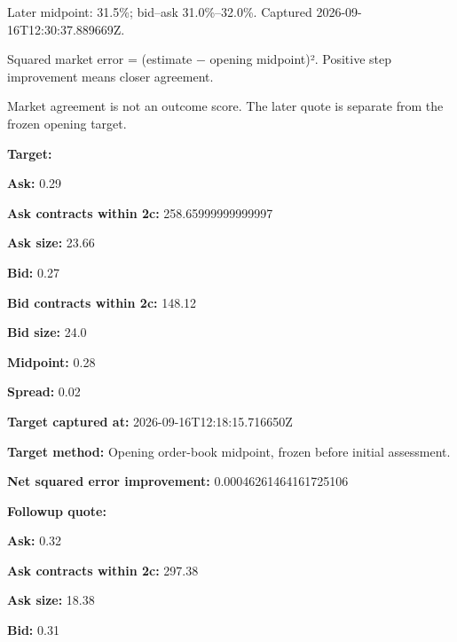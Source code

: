 \documentclass[11pt]{article}
\begin{document}
Later midpoint: 31.5\%; bid–ask 31.0\%–32.0\%. Captured 2026-09-16T12:30:37.889669Z.


Squared market error = (estimate − opening midpoint)². Positive step improvement means closer agreement.


Market agreement is not an outcome score. The later quote is separate from the frozen opening target.


\par\noindent\textbf{Target:} \par \par\noindent\textbf{Ask:} 0.29

\par\noindent\textbf{Ask contracts within 2c:} 258.65999999999997

\par\noindent\textbf{Ask size:} 23.66

\par\noindent\textbf{Bid:} 0.27

\par\noindent\textbf{Bid contracts within 2c:} 148.12

\par\noindent\textbf{Bid size:} 24.0

\par\noindent\textbf{Midpoint:} 0.28

\par\noindent\textbf{Spread:} 0.02

\par\noindent\textbf{Target captured at:} 2026-09-16T12:18:15.716650Z

\par\noindent\textbf{Target method:} Opening order-book midpoint, frozen before initial assessment.

\par\noindent\textbf{Net squared error improvement:} 0.00046261464161725106

\par\noindent\textbf{Followup quote:} \par \par\noindent\textbf{Ask:} 0.32

\par\noindent\textbf{Ask contracts within 2c:} 297.38

\par\noindent\textbf{Ask size:} 18.38

\par\noindent\textbf{Bid:} 0.31
\end{document}

